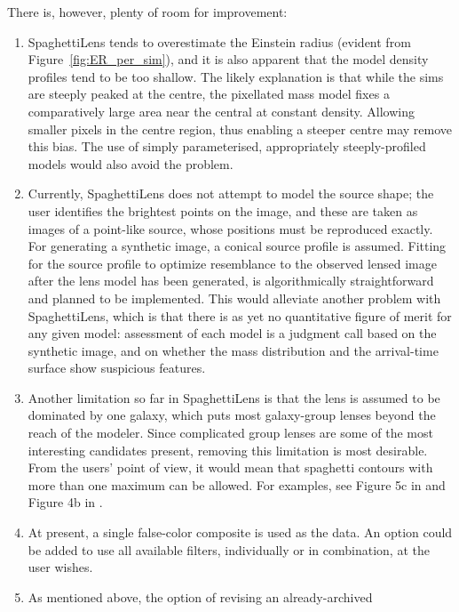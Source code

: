 \documentclass[usenatbib]{mn2e}
\newcommand{\spl}{SpaghettiLens\xspace}
\newcommand{\Figref}[1]{Figure~\ref{fig:#1}}
\begin{document}
There is, however, plenty of room for improvement:
\begin{enumerate}
\item \spl tends to overestimate the Einstein radius (evident from
  \Figref{ER_per_sim}), and it is also apparent that the model density
  profiles tend to be too shallow.  The likely explanation is that
  while the sims are steeply peaked at the centre, the pixellated mass
  model fixes a comparatively large area near the central at constant
  density. Allowing smaller pixels in the centre region, thus enabling
  a steeper centre \citep[similar to the ``high resolution'' feature
    implemented in][]{2014arXiv1401.7990C} may remove this bias.  The
  use of simply parameterised, appropriately steeply-profiled models
  would also avoid the problem.
\item Currently, \spl does not attempt to model the source shape; the
  user identifies the brightest points on the image, and these are
  taken as images of a point-like source, whose positions must be
  reproduced exactly. For generating a synthetic image, a conical
  source profile is assumed. Fitting for the source profile to
  optimize resemblance to the observed lensed image after the lens
  model has been generated, is algorithmically straightforward
  \citep[cf.][]{2003ApJ...590..673W,2006MNRAS.371..983S} and planned
  to be implemented.  This would alleviate another problem with \spl,
  which is that there is as yet no quantitative figure of merit for
  any given model: assessment of each model is a judgment call based
  on the synthetic image, and on whether the mass distribution and the
  arrival-time surface show suspicious features.
\item Another limitation so far in \spl is that the lens is assumed to
  be dominated by one galaxy, which puts most galaxy-group lenses
  beyond the reach of the modeler. Since complicated group lenses are
  some of the most interesting candidates present, removing this
  limitation is most desirable.  From the users' point of view, it
  would mean that spaghetti contours with more than one maximum can be
  allowed.  For examples, see Figure 5c in \citep{2001ApJ...557..594R}
  and Figure 4b in \cite{2003ApJ...590...39K}.
\item At present, a single false-color composite is used as the data.
  An option could be added to use all available filters, individually
  or in combination, at the user wishes.
\item As mentioned above, the option of revising an already-archived

\end{enumerate}
\end{document}

